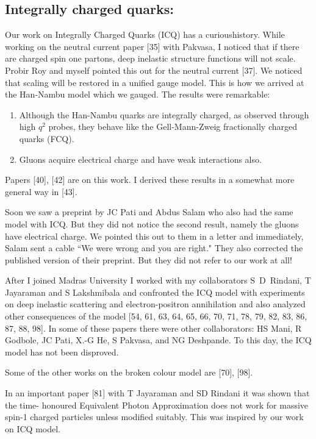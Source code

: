 \subsection*{Integrally charged quarks:}

Our work on Integrally Charged Quarks (ICQ) has a curious\break history. While 
working on the neutral current paper [35] with Pakvasa, I noticed that 
if there are charged spin one partons, deep inelastic structure 
functions will not scale. Probir Roy and myself pointed this out for the 
neutral current [37]. We noticed that scaling will be restored in a 
unified gauge model. This is how we arrived at the Han-Nambu model which 
we gauged. The results were remarkable:

\begin{enumerate}
\item Although the Han-Nambu quarks are integrally charged, as observed 
through high $q^2$ probes, they behave like the Gell-Mann-Zweig 
fractionally charged quarks (FCQ).
\item Gluons acquire electrical charge and have weak interactions also.
\end{enumerate}

Papers [40], [42] are on this work. I derived these results in a somewhat 
more general way in [43].

Soon we saw a preprint by JC Pati and Abdus Salam who also had the same 
model with ICQ. But they did not notice the second result, namely the 
gluons have electrical charge. We pointed this out to them in a letter 
and immediately, Salam sent a cable ``We were wrong and you are right." 
They also corrected the published version of their preprint. But they 
did not refer to our work at all!

After I joined Madras University I worked with my collabora\-tors 
S~D~Rindani, T Jayaraman and S Lakshmibala and confronted the\- ICQ model with 
experiments on deep inelastic scatte\-ring and electron-positron 
annihilation and also analyzed other consequences of the model 
[54, 61, 63, 64, 65, 66, 70, 71, 78, 79, 82, 83, 86, 87, 88, 98]. In some of these 
papers there were other collaborators: HS Mani, R Godbole, JC Pati, X.-G 
He, S Pakvasa, and NG Deshpande. To this day, the ICQ model has not been 
disproved.

Some of the other works on the broken colour model are [70], [98].

In an important paper [81] with T Jayaraman and SD Rindani it was shown 
that the time- honoured Equivalent Photon Approxi\-mation does not work 
for massive spin-1 charged particles unless modified suitably. This was 
inspired by our work on ICQ model.

